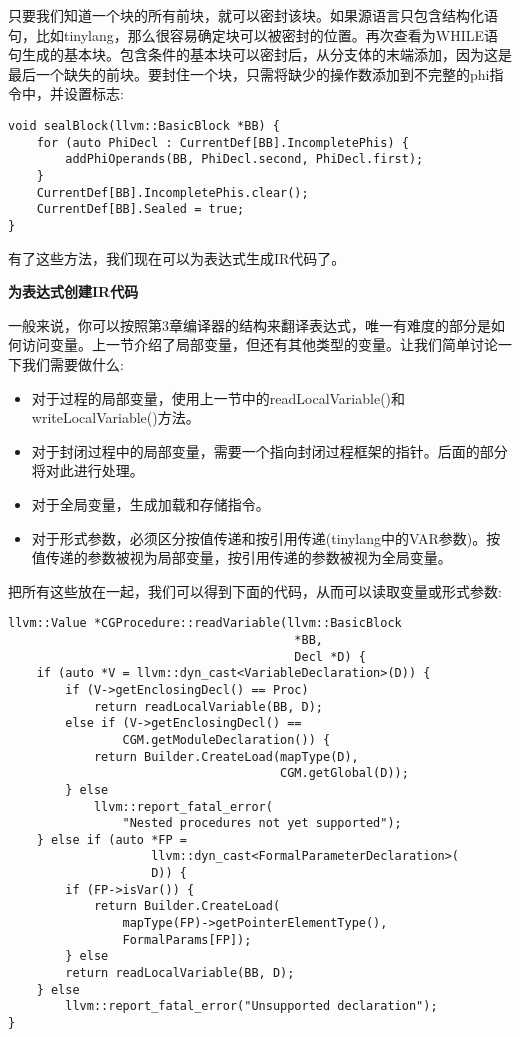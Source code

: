 只要我们知道一个块的所有前块，就可以密封该块。如果源语言只包含结构化语句，比如tinylang，那么很容易确定块可以被密封的位置。再次查看为WHILE语句生成的基本块。包含条件的基本块可以密封后，从分支体的末端添加，因为这是最后一个缺失的前块。要封住一个块，只需将缺少的操作数添加到不完整的phi指令中，并设置标志:\par

\begin{lstlisting}[caption={}]
void sealBlock(llvm::BasicBlock *BB) {
	for (auto PhiDecl : CurrentDef[BB].IncompletePhis) {
		addPhiOperands(BB, PhiDecl.second, PhiDecl.first);
	}
	CurrentDef[BB].IncompletePhis.clear();
	CurrentDef[BB].Sealed = true;
}
\end{lstlisting}

有了这些方法，我们现在可以为表达式生成IR代码了。\par

\hspace*{\fill} \par %
\textbf{为表达式创建IR代码}

一般来说，你可以按照第3章编译器的结构来翻译表达式，唯一有难度的部分是如何访问变量。上一节介绍了局部变量，但还有其他类型的变量。让我们简单讨论一下我们需要做什么:\par

\begin{itemize}
	\item 对于过程的局部变量，使用上一节中的readLocalVariable()和writeLocalVariable()方法。
	\item 对于封闭过程中的局部变量，需要一个指向封闭过程框架的指针。后面的部分将对此进行处理。
	\item 对于全局变量，生成加载和存储指令。
	\item 对于形式参数，必须区分按值传递和按引用传递(tinylang中的VAR参数)。按值传递的参数被视为局部变量，按引用传递的参数被视为全局变量。
\end{itemize}

把所有这些放在一起，我们可以得到下面的代码，从而可以读取变量或形式参数:\par

\begin{lstlisting}[caption={}]
llvm::Value *CGProcedure::readVariable(llvm::BasicBlock
										*BB,
										Decl *D) {
	if (auto *V = llvm::dyn_cast<VariableDeclaration>(D)) {
		if (V->getEnclosingDecl() == Proc)
			return readLocalVariable(BB, D);
		else if (V->getEnclosingDecl() ==
				CGM.getModuleDeclaration()) {
			return Builder.CreateLoad(mapType(D),
									  CGM.getGlobal(D));
		} else
			llvm::report_fatal_error(
				"Nested procedures not yet supported");
	} else if (auto *FP =
					llvm::dyn_cast<FormalParameterDeclaration>(
					D)) {
		if (FP->isVar()) {
			return Builder.CreateLoad(
				mapType(FP)->getPointerElementType(),
				FormalParams[FP]);
		} else
		return readLocalVariable(BB, D);
	} else
		llvm::report_fatal_error("Unsupported declaration");
}
\end{lstlisting}

